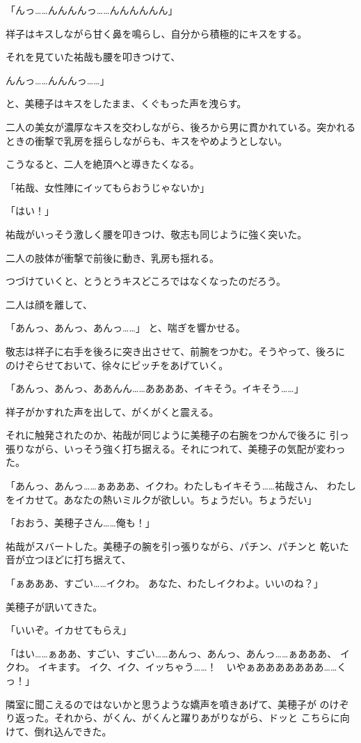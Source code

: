 ﻿\documentclass[
    book,tate,
    line_length=30zw,
    jafontsize=12pt,
    paper=b5j,
    landscape,
    ]{jlreq}
\begin{document}
「んっ……んんんんっ……んんんんんん」

祥子はキスしながら甘く鼻を鳴らし、自分から積極的にキスをする。

それを見ていた祐哉も腰を叩きつけて、

んんっ……んんんっ……」

と、美穂子はキスをしたまま、くぐもった声を洩らす。

二人の美女が濃厚なキスを交わしながら、後ろから男に貫かれている。突かれる
ときの衝撃で乳房を揺らしながらも、キスをやめようとしない。

こうなると、二人を絶頂へと導きたくなる。

「祐哉、女性陣にイッてもらおうじゃないか」

「はい！」

祐哉がいっそう激しく腰を叩きつけ、敬志も同じように強く突いた。

二人の肢体が衝撃で前後に動き、乳房も揺れる。

つづけていくと、とうとうキスどころではなくなったのだろう。

二人は顔を離して、

「あんっ、あんっ、あんっ……」
と、喘ぎを響かせる。

敬志は祥子に右手を後ろに突き出させて、前腕をつかむ。そうやって、後ろに
のけぞらせておいて、徐々にピッチをあげていく。

「あんっ、あんっ、ああんん……ああああ、イキそう。イキそう……」

祥子がかすれた声を出して、がくがくと震える。

それに触発されたのか、祐哉が同じように美穂子の右腕をつかんで後ろに
引っ張りながら、いっそう強く打ち据える。それにつれて、美穂子の気配が変わった。

「あんっ、あんっ……ぁあああ、イクわ。わたしもイキそう……祐哉さん、
わたしをイカせて。あなたの熱いミルクが欲しい。ちょうだい。ちょうだい」

「おおう、美穂子さん……俺も！」

祐哉がスバートした。美穂子の腕を引っ張りながら、パチン、パチンと
乾いた音が立つほどに打ち据えて、

「ぁあああ、すごい……イクわ。 あなた、わたしイクわよ。いいのね？」

美穂子が訊いてきた。

「いいぞ。イカせてもらえ」

「はい……ぁああ、すごい、すごい……あんっ、あんっ、あんっ……ぁあああ、
イクわ。 イキます。 イク、イク、イッちゃう……！　いやぁあああああああ……くっ！」

隣室に聞こえるのではないかと思うような嬌声を噴きあげて、美穂子が
のけぞり返った。それから、がくん、がくんと躍りあがりながら、ドッと
こちらに向けて、倒れ込んできた。
\end{document}
